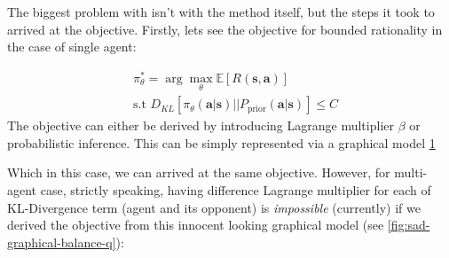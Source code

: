 The biggest problem with \cite{grau2018balancing} isn't with the method itself, but the steps it took to arrived at the objective. Firstly, lets see the objective for bounded rationality in the case of single agent:

\begin{equation}
    \begin{aligned}
        &\pi_{\theta}^* = \arg\max_{\theta} \mathbb{E}\left[ R(\boldsymbol{s}, \boldsymbol{a}) \right] \\
        &\text{s.t } D_{KL}\left[ \pi_{\theta}(\boldsymbol{a} | \boldsymbol{s}) \Big|\Big| P_{\text{prior}}(\boldsymbol{a} | \boldsymbol{s}) \right] \le C
    \end{aligned}
\end{equation}
The objective can either be derived by introducing Lagrange multiplier $\beta$ or probabilistic inference. This can be simply represented via a graphical model \ref{fig:one-step-single agent}
\begin{figure}[t]
    \begin{minipage}[t]{0.5\linewidth}
    \centering
    \end{minipage}%
    \begin{minipage}[t]{0.5\linewidth}
    \label{fig:one-step-single agent}
    \end{minipage}
\end{figure}
Which in this case, we can arrived at the same objective. However, for multi-agent case, strictly speaking, having difference Lagrange multiplier for each of KL-Divergence term (agent and its opponent) is \emph{impossible} (currently) if we derived the objective from this innocent looking graphical model (see \ref{fig:sad-graphical-balance-q}): 

